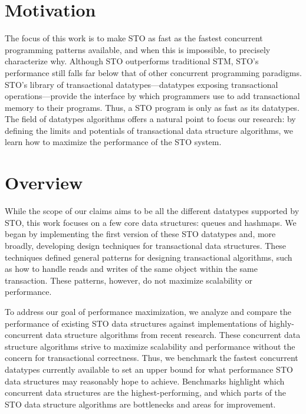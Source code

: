 \section{Motivation}
The focus of this work is to make STO as fast as the fastest concurrent programming patterns available, and when this is impossible, to precisely characterize why. Although STO outperforms traditional STM, STO’s performance still falls far below that of other concurrent programming paradigms. STO’s library of transactional datatypes---datatypes exposing transactional operations---provide the interface by which programmers use to add transactional memory to their programs. Thus, a STO program is only as fast as its datatypes. The field of datatypes algorithms offers a natural point to focus our research: by defining the limits and potentials of transactional data structure algorithms, we learn how to maximize the performance of the STO system.

\section{Overview}
While the scope of our claims aims to be all the different datatypes supported by STO, this work focuses on a few core data structures: queues and hashmaps. We began by implementing the first version of these STO datatypes and, more broadly, developing design techniques for transactional data structures. These techniques defined general patterns for designing transactional algorithms, such as how to handle reads and writes of the same object within the same transaction. These patterns, however, do not maximize scalability or performance.

To address our goal of performance maximization, we analyze and compare the performance of existing STO data structures against implementations of highly-concurrent data structure algorithms from recent research. These concurrent data structure algorithms strive to maximize scalability and performance without the concern for transactional correctness. Thus, we benchmark the fastest concurrent datatypes currently available to set an upper bound for what performance STO data structures may reasonably hope to achieve. Benchmarks highlight which concurrent data structures are the highest-performing, and which parts of the STO data structure algorithms are bottlenecks and areas for improvement. 

